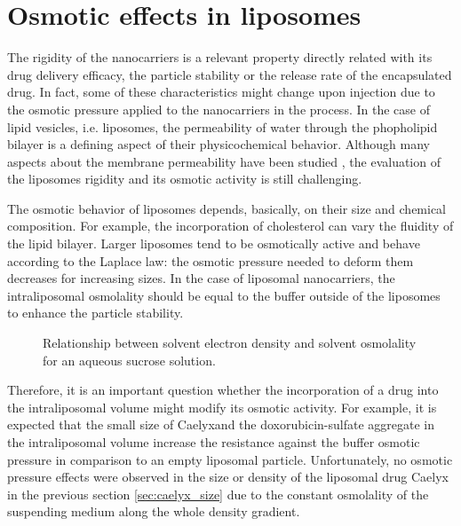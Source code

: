 \section{Osmotic effects in liposomes}

The rigidity of the nanocarriers is a relevant property directly related with its drug delivery efficacy, the particle stability or the release rate of the encapsulated drug. In fact, some of these characteristics might change upon injection due to the osmotic pressure applied to the nanocarriers in the process. In the case of lipid vesicles, i.e. liposomes, the permeability of water through the phopholipid bilayer is a defining aspect of their physicochemical behavior. Although many aspects about the membrane permeability have been studied \citep{nagle_theory_2008, mathai_structural_2008, olbrich_water_2000}, the evaluation of the liposomes rigidity and its osmotic activity is still challenging.

The osmotic behavior of liposomes depends, basically, on their size and chemical composition. For example, the incorporation of cholesterol can vary the fluidity of the lipid bilayer. Larger liposomes tend to be osmotically active \citep{de_gier_osmotic_1993} and behave according to the Laplace law: the osmotic pressure needed to deform them decreases for increasing sizes. In the case of liposomal nanocarriers, the intraliposomal osmolality should be equal to the buffer outside of the liposomes to enhance the particle stability. 

\begin{figure}
	\centering
		
		\caption[Relationship between solvent electron density and solvent osmolality for an aqueous sucrose solution.]{Relationship between solvent electron density and solvent osmolality for an aqueous sucrose solution.}
		\label{fig:OsmolalityElectronDensity}
\end{figure}



Therefore, it is an important question whether the incorporation of a drug into the intraliposomal volume might modify its osmotic activity. For example, it is expected that the small size of Caelyx\textregistered and the doxorubicin-sulfate aggregate in the intraliposomal volume increase the resistance against the buffer osmotic pressure in comparison to an empty liposomal particle. Unfortunately, no osmotic pressure effects were observed in the size or density of the liposomal drug Caelyx \textregistered in the previous section \ref{sec:caelyx_size} due to the constant osmolality of the suspending medium along the whole density gradient.

